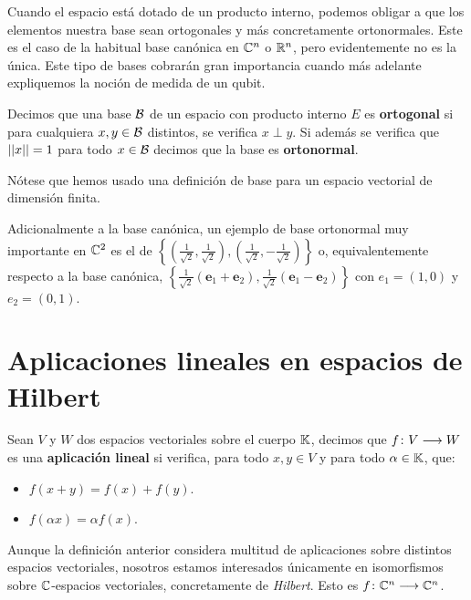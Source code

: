 Cuando el espacio está dotado de un producto interno, podemos obligar a que los elementos nuestra base sean ortogonales y más concretamente ortonormales. Este es el caso de la habitual base canónica en $\mathbb{C}^n$ o $\mathbb{R}^n$, pero evidentemente no es la única. Este tipo de bases cobrarán gran importancia cuando más adelante expliquemos la noción de medida de un qubit.

\begin{definition} Decimos que una base $\mathcal{B}$ de un espacio con producto interno $E$ es \textbf{ortogonal} si para cualquiera $x,y\in\mathcal{B}$ distintos, se verifica $x\perp y$. Si además se verifica que $\left|\left|x\right|\right|=1$ para todo $x\in\mathcal{B}$ decimos que la base es \textbf{ortonormal}.

Nótese que hemos usado una definición de base para un espacio vectorial de dimensión finita.
\end{definition}

\begin{example} \label{ex:ex34} Adicionalmente a la base canónica, un ejemplo de base ortonormal muy importante en $\mathbb{C}^2$ es el de $\left\{\left(\frac{1}{\sqrt{2}},\frac{1}{\sqrt{2}}\right),\left(\frac{1}{\sqrt{2}},-\frac{1}{\sqrt{2}}\right)\right\}$ o, equivalentemente respecto a la base canónica, $\left\{\frac{1}{\sqrt{2}}\left(\textbf{e}_1 + \textbf{e}_2\right),\frac{1}{\sqrt{2}}\left(\textbf{e}_1 - \textbf{e}_2\right)\right\}$ con $e_1=(1,0)$ y $e_2=(0,1)$.
\end{example}

\section{Aplicaciones lineales en espacios de Hilbert}

\begin{definition} Sean $V$ y $W$ dos espacios vectoriales sobre el cuerpo $\mathbb{K}$, decimos que $f\colon V\longrightarrow W$ es una \textbf{aplicación lineal} si verifica, para todo $x,y\in V$ y para todo $\alpha\in\mathbb{K}$, que:
\begin{itemize}
\item $f(x+y)=f(x)+f(y)$.
\item $f(\alpha x)=\alpha f(x)$.
\end{itemize}
\end{definition}

Aunque la definición anterior considera multitud de aplicaciones sobre distintos espacios vectoriales, nosotros estamos interesados únicamente en isomorfismos sobre $\mathbb{C}$-espacios vectoriales, concretamente de \textit{Hilbert}. Esto es $f\colon \mathbb{C}^n\longrightarrow \mathbb{C}^n$.

